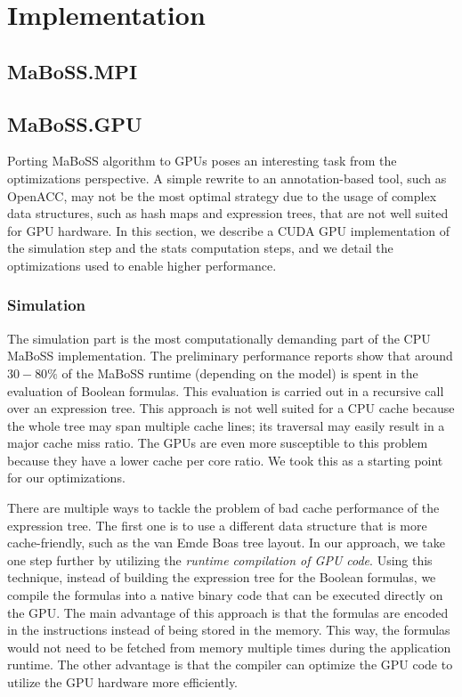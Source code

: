 \documentclass[times, twoside]{zHenriquesLab-StyleBioRxiv}
\begin{document}
\section*{Implementation}
\subsection*{MaBoSS.MPI}

\subsection*{MaBoSS.GPU}
Porting MaBoSS algorithm to GPUs poses an interesting task from the optimizations perspective. A simple rewrite to an annotation-based tool, such as OpenACC, may not be the most optimal strategy due to the usage of complex data structures, such as hash maps and expression trees, that are not well suited for GPU hardware. In this section, we describe a CUDA GPU implementation of the simulation step and the stats computation steps, and we detail the optimizations used to enable higher performance.

\subsubsection*{Simulation}

The simulation part is the most computationally demanding part of the CPU MaBoSS implementation. The preliminary performance reports show that around $30-80\%$ of the MaBoSS runtime (depending on the model) is spent in the evaluation of Boolean formulas. This evaluation is carried out in a recursive call over an expression tree. This approach is not well suited for a CPU cache because the whole tree may span multiple cache lines; its traversal may easily result in a major cache miss ratio. The GPUs are even more susceptible to this problem because they have a lower cache per core ratio. We took this as a starting point for our optimizations.

There are multiple ways to tackle the problem of bad cache performance of the expression tree. The first one is to use a different data structure that is more cache-friendly, such as the van Emde Boas tree layout. In our approach, we take one step further by utilizing the \emph{runtime compilation of GPU code}. Using this technique, instead of building the expression tree for the Boolean formulas, we compile the formulas into a native binary code that can be executed directly on the GPU. The main advantage of this approach is that the formulas are encoded in the instructions instead of being stored in the memory. This way, the formulas would not need to be fetched from memory multiple times during the application runtime. The other advantage is that the compiler can optimize the GPU code to utilize the GPU hardware more efficiently. 
\end{document}
